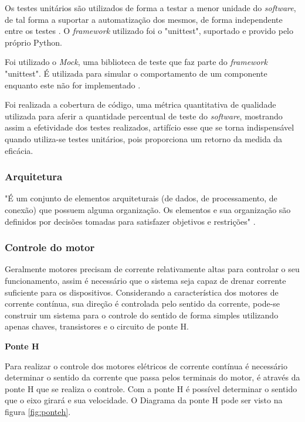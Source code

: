 Os testes unitários são utilizados de forma a testar a menor unidade do \textit{software}, de tal forma a suportar a automatização dos mesmos, de forma independente entre os testes \cite{unittest}. O \textit{framework} utilizado foi o "unittest", suportado e provido pelo próprio Python.

Foi utilizado o \textit{Mock}, uma biblioteca de teste que faz parte do \textit{framework} "unittest". É utilizada para simular o comportamento de um componente enquanto este não for implementado \cite{unittest_mock}.

Foi realizada a cobertura de código, uma métrica quantitativa de qualidade utilizada para aferir a quantidade percentual de teste do \textit{software}, mostrando assim a efetividade dos testes realizados, artifício esse que se torna indispensável quando utiliza-se testes unitários, pois proporciona um retorno da medida da eficácia.

\subsubsection{Arquitetura}

"É um conjunto de elementos arquiteturais (de dados, de processamento, de conexão) que possuem alguma organização. Os elementos e sua organização são definidos por decisões tomadas para satisfazer objetivos e restrições" \cite{arquitetura_definition}.

\subsubsection{Controle do motor}

Geralmente motores precisam de corrente relativamente altas para controlar o seu funcionamento, assim é necessário que o sistema seja capaz de drenar corrente suficiente para os dispositivos. Considerando a característica dos motores de corrente contínua, sua direção é controlada pelo sentido da corrente, pode-se construir um sistema para o controle do sentido de forma simples utilizando apenas chaves, transistores e o circuito de ponte H.

\textbf{Ponte H}

Para realizar o controle dos motores elétricos de corrente contínua é necessário determinar o sentido da corrente que passa pelos terminais do motor, é através da ponte H que se realiza o controle. Com a ponte H é possível determinar o sentido que o eixo girará e sua velocidade. O Diagrama da ponte H pode ser visto na figura \ref{fig:ponteh}.

